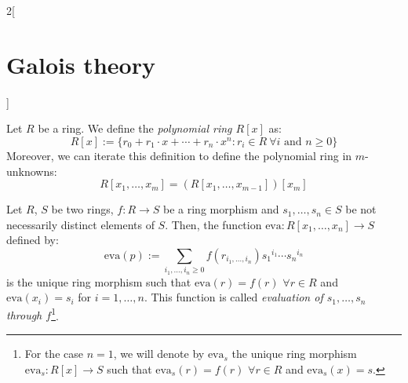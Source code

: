 \documentclass[../../../main.tex]{subfiles}
\begin{document}
\begin{multicols}{2}[\section{Galois theory}]
\begin{prop}
  \end{prop}
  \begin{definition}
    Let $R$ be a ring. We define the  \textit{polynomial ring $R[x]$} as: $$R[x]:=\{r_0+r_1\cdot x+\cdots+r_n\cdot x^n:r_i\in R\ \forall i\text{ and }n\geq 0\}$$ Moreover, we can iterate this definition to define the polynomial ring in $m$-unknowns: $$R[x_1,\ldots,x_m]=\left(R[x_1,\ldots,x_{m-1}]\right)[x_m]$$
  \end{definition}
  \begin{prop}
    Let $R$, $S$ be two rings, $f:R\rightarrow S$ be a ring morphism and $s_1,\ldots,s_n\in S$ be not necessarily distinct elements of $S$. Then, the function $\text{eva}:R[x_1,\ldots,x_n]\rightarrow S$ defined by: $$\text{eva}(p):=\sum_{i_1,\ldots,i_n\geq 0}f(r_{i_1,\ldots,i_n}){s_1}^{i_1}\cdots {s_n}^{i_n}$$ is the unique ring morphism such that $\text{eva}(r)=f(r)$ $\forall r\in R$ and $\text{eva}(x_i)=s_i$ for $i=1,\ldots,n$. This function is called \textit{evaluation of $s_1,\ldots,s_n$ through $f$}\footnote{For the case $n=1$, we will denote by $\text{eva}_s$ the unique ring morphism $\text{eva}_s:R[x]\rightarrow S$ such that $\text{eva}_s(r)=f(r)$ $\forall r\in R$ and $\text{eva}_s(x)=s$.}.
  \end{prop}

\end{multicols}
\end{document}
